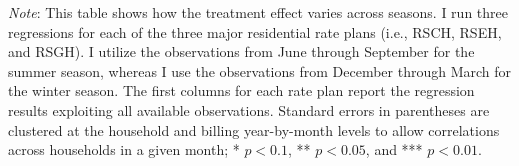 {\begin{table}[t!]
\begin{adjustbox}{scale = 0.74}
\begin{threeparttable}
\begin{tablenotes}[flushleft]
                    \item \textit{Note}: This table shows how the treatment effect varies across seasons. I run three regressions for each of the three major residential rate plans (i.e., RSCH, RSEH, and RSGH). I utilize the observations from June through September for the summer season, whereas I use the observations from December through March for the winter season. The first columns for each rate plan report the regression results exploiting all available observations. Standard errors in parentheses are clustered at the household and billing year-by-month levels to allow correlations across households in a given month; * $p < 0.1$, ** $p < 0.05$, and *** $p < 0.01$.
                \end{tablenotes}
            \end{threeparttable}
        \end{adjustbox}
    \end{table}
}
